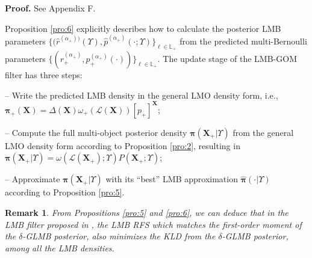 \documentclass[journal]{IEEEtran}
\newcommand{\bX}{{\mathbf X}}
\newcommand{\bpi}{{\boldsymbol\pi}}
\newtheorem{Rem}{Remark}
\newcommand{\proproof}[1]{\noindent\textbf{Proof. } See Appendix #1.}
\begin{document}
{\proproof{F}





Proposition \ref{pro:6} explicitly describes how to calculate the posterior 
LMB parameters  $\{(\hat r^{(\alpha_{+}))}(\Upsilon),\hat p^{(\alpha_{+})}(\cdot;\Upsilon)\}_{\ell\in\mathbb{L}_+}$  from the predicted multi-Bernoulli parameters $\{(r_+^{(\alpha_{+})},p_+^{(\alpha_{+})}(\cdot))\}_{\ell\in\mathbb{L}_+}$. The update stage of the LMB-GOM filter  has three steps:

\noindent-- Write the predicted LMB density in the general LMO density form, i.e., $\bpi_+(\bX)=\Delta(\bX)\omega_+(\mathcal{L}(\bX))[p_+]^\bX$;

\noindent-- Compute the full multi-object posterior density $\bpi(\bX_{+}|\Upsilon)$ from the general LMO density form according to Proposition \ref{pro:2}, resulting in $\bpi(\bX_{+}|\Upsilon)=\omega(\mathcal{L}(\bX_{+});\Upsilon)P(\bX_{+};\Upsilon)$; 


\noindent-- Approximate $\bpi(\bX_{+}|\Upsilon)$  with its ``best'' LMB approximation $\hat\bpi(\cdot|\Upsilon)$ according to Proposition \ref{pro:5}.
\begin{Rem}\label{remark:4}
From Propositions \ref{pro:5} and \ref{pro:6}, we can deduce that in the LMB filter proposed in \cite{refr:label_5}, the LMB RFS which matches the first-order moment of the $\delta$-GLMB posterior, also minimizes the KLD from the $\delta$-GLMB posterior, among all the LMB densities.
\end{Rem}


}
\end{document}
